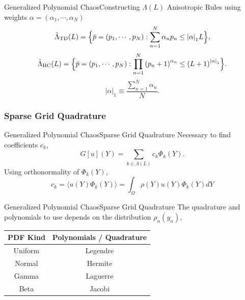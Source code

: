\documentclass{beamer}
\begin{document}
\begin{frame}{Generalized Polynomial Chaos}{Constructing $\Lambda(L)$}%
  Anisotropic Rules using weights $\alpha = (\alpha_1,\cdots,\alpha_N)$
  \begin{equation*}
    \tilde\Lambda_\text{TD}(L)=\Big\{\bar p=(p_1,\cdots,p_N):\sum_{n=1}^N \alpha_n p_n \leq \qty|\alpha|_1 L
  \Big\},
  \end{equation*}
  \begin{equation*}
    \tilde\Lambda_\text{HC}(L)=\Big\{\bar p=(p_1,\cdots,p_N):\prod_{n=1}^N \qty(p_n+1)^{\alpha_n} \leq
    \qty(L+1)^{\qty|\alpha|_1} \Big\}.
  \end{equation*}
  \begin{equation*}
    |\alpha|_1 \equiv \frac{\sum_{n=1}^N \alpha_n}{N}.
  \end{equation*}
\end{frame}


\subsubsection{Sparse Grid Quadrature}
\begin{frame}{Generalized Polynomial Chaos}{Sparse Grid Quadrature}%
  \pause
  Necessary to find coefficients $c_k$,
  \begin{equation*}
    G[u](Y) = \sum_{k\in\Lambda(L)} c_k \Phi_k(Y).
  \end{equation*}%
  Using orthonormality of $\Phi_k(Y)$,
  \begin{equation*}
    c_k = \langle u(Y)\Phi_k(Y) \rangle = \int_\Omega \rho(Y) u(Y)\Phi_k(Y) dY
  \end{equation*}
\end{frame}

\begin{frame}{Generalized Polynomial Chaos}{Sparse Grid Quadrature}%
  The quadrature and polynomials to use depends on the distribution $\rho_n(y_n)$,
  \begin{table}[h]
    \centering
    \begin{tabular}{c|c}
      PDF Kind & Polynomials / Quadrature \\ \hline
      Uniform & Legendre \\
      Normal  & Hermite  \\
      Gamma   & Laguerre \\
      Beta    & Jacobi   
    \end{tabular}
  \end{table}
\end{frame}
\end{document}
